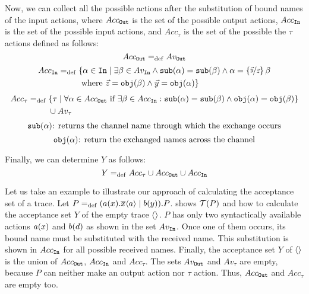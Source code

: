 Now, we can collect all the possible actions after the substitution of bound names of the input actions, where $Acc_{\mathtt{Out}}$ is the set of the possible output actions, $Acc_{\mathtt{In}}$ is the set of the possible input actions, and $Acc_\tau$ is the set of the possible the $\tau$ actions defined as follows:
\[Acc_{\mathtt{Out}} =_{\mathrm{def}} Av_{\mathtt{Out}}\]
\begin{equation*}
\begin{aligned}
Acc_{\mathtt{In}} =_{\mathrm{def}}{} & \{\alpha \in \mathtt{In} \mid \exists \beta \in Av_{\mathtt{In}} \wedge \mathtt{sub}(\alpha)=\mathtt{sub}(\beta) \wedge \alpha=\left\{\nicefrac{\vec{y}}{\vec{z}}\right\}\beta \\
      &  \text{ where } \vec{z}=\mathtt{obj}(\beta) \wedge \vec{y}=\mathtt{obj}(\alpha) \}
\end{aligned}
\end{equation*}
\begin{equation*}
\begin{aligned}
Acc_\tau =_{\mathrm{def}}{} & \{\tau \mid \forall \alpha \in Acc_{\mathtt{Out}} \text{ if } \exists \beta \in Acc_{\mathtt{In}}  :\mathtt{sub}(\alpha)=\mathtt{sub}(\beta) \wedge \mathtt{obj}(\alpha)=\mathtt{obj}(\beta)  \} \\
      &  \cup Av_\tau
\end{aligned}
\end{equation*}
\[\mathtt{sub}(\alpha) \text{: returns the channel name through which the exchange occurs}\]
\[\mathtt{obj}(\alpha) \text{: return the exchanged names across the channel}\]

Finally, we can determine $Y$ as follows:
\[Y =_{\mathrm{def}} Acc_\tau \cup Acc_{\mathtt{Out}} \cup Acc_{\mathtt{In}}\]

Let us take an example to illustrate our approach of calculating the acceptance set of a trace. Let $P=_{\mathrm{def}}(a(x).\overline{x}\langle a\rangle \mid b(y)).P$.   shows $\Traces[P]$ and how to calculate the acceptance set $Y$ of the empty trace $\overline{}\langle\rangle$. $P$ has only two syntactically available actions $a(x)$ and $b(d)$ as shown in the set $Av_{\mathtt{In}}$. Once one of them occurs, its bound name must be substituted with the received name. This substitution is shown in $Acc_{\mathtt{In}}$ for all possible received names. Finally, the acceptance set $Y$ of $\overline{}\langle\rangle$ is the union of $Acc_{\mathtt{Out}}$, $Acc_{\mathtt{In}}$ and $Acc_\tau$. 
The sets $Av_{\mathtt{Out}}$ and $Av_\tau$ are empty, because $P$ can neither make an output action nor $\tau$ action. Thus, $Acc_{\mathtt{Out}}$ and $Acc_\tau$ are empty too.
    
